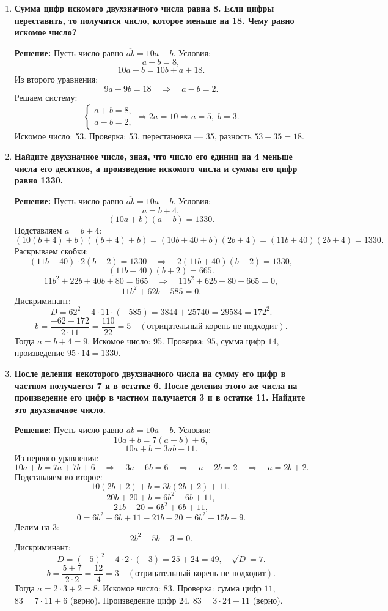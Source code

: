 \documentclass[12pt, a4paper]{article}
\begin{document}
\begin{enumerate}[label=\arabic*., wide=0pt, leftmargin=*]
\item \textbf{Сумма цифр искомого двухзначного числа равна 8. Если цифры переставить, то получится число, которое меньше на 18. Чему равно искомое число?}

\textbf{Решение:}
Пусть число равно \(\overline{ab} = 10a + b\). Условия:
\[
a + b = 8,
\]
\[
10a + b = 10b + a + 18.
\]
Из второго уравнения:
\[
9a - 9b = 18 \quad\Rightarrow\quad a - b = 2.
\]
Решаем систему:
\[
\begin{cases}
a + b = 8,\\
a - b = 2,
\end{cases}
\Rightarrow
2a = 10 \Rightarrow a = 5,\; b = 3.
\]
Искомое число: 53. 
Проверка: 53, перестановка — 35, разность \(53 - 35 = 18\).

\item \textbf{Найдите двухзначное число, зная, что число его единиц на 4 меньше числа его десятков, а произведение искомого числа и суммы его цифр равно 1330.}

\textbf{Решение:}
Пусть число равно \(\overline{ab} = 10a + b\). Условия:
\[
a = b + 4,
\]
\[
(10a + b)(a + b) = 1330.
\]
Подставляем \(a = b + 4\):
\[
(10(b+4) + b)((b+4) + b) = (10b + 40 + b)(2b + 4) = (11b + 40)(2b + 4) = 1330.
\]
Раскрываем скобки:
\[
(11b + 40) \cdot 2(b + 2) = 1330 \quad\Rightarrow\quad 2(11b + 40)(b + 2) = 1330,
\]
\[
(11b + 40)(b + 2) = 665.
\]
\[
11b^2 + 22b + 40b + 80 = 665 \quad\Rightarrow\quad 11b^2 + 62b + 80 - 665 = 0,
\]
\[
11b^2 + 62b - 585 = 0.
\]
Дискриминант:
\[
D = 62^2 - 4 \cdot 11 \cdot (-585) = 3844 + 25740 = 29584 = 172^2.
\]
\[
b = \frac{-62 + 172}{2 \cdot 11} = \frac{110}{22} = 5 \quad (\text{отрицательный корень не подходит}).
\]
Тогда \(a = b + 4 = 9\). Искомое число: 95. 
Проверка: \(95\), сумма цифр \(14\), произведение \(95 \cdot 14 = 1330\).

\item \textbf{После деления некоторого двухзначного числа на сумму его цифр в частном получается 7 и в остатке 6. После деления этого же числа на произведение его цифр в частном получается 3 и в остатке 11. Найдите это двухзначное число.}

\textbf{Решение:}
Пусть число равно \(\overline{ab} = 10a + b\). Условия:
\[
10a + b = 7(a + b) + 6,
\]
\[
10a + b = 3ab + 11.
\]
Из первого уравнения:
\[
10a + b = 7a + 7b + 6 \quad\Rightarrow\quad 3a - 6b = 6 \quad\Rightarrow\quad a - 2b = 2 \quad\Rightarrow\quad a = 2b + 2.
\]
Подставляем во второе:
\[
10(2b + 2) + b = 3b(2b + 2) + 11,
\]
\[
20b + 20 + b = 6b^2 + 6b + 11,
\]
\[
21b + 20 = 6b^2 + 6b + 11,
\]
\[
0 = 6b^2 + 6b + 11 - 21b - 20 = 6b^2 - 15b - 9.
\]
Делим на 3:
\[
2b^2 - 5b - 3 = 0.
\]
Дискриминант:
\[
D = (-5)^2 - 4 \cdot 2 \cdot (-3) = 25 + 24 = 49,\quad \sqrt{D} = 7.
\]
\[
b = \frac{5 + 7}{2 \cdot 2} = \frac{12}{4} = 3 \quad (\text{отрицательный корень не подходит}).
\]
Тогда \(a = 2 \cdot 3 + 2 = 8\). Искомое число: 83. 
Проверка: сумма цифр \(11\), \(83 = 7 \cdot 11 + 6\) (верно). Произведение цифр \(24\), \(83 = 3 \cdot 24 + 11\) (верно).


\end{enumerate}
\end{document}

